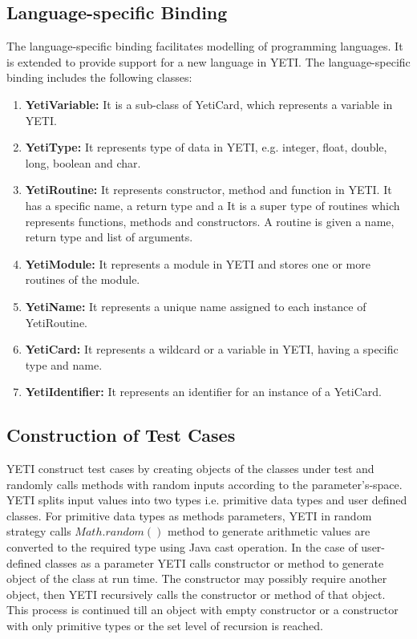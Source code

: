 \subsection{Language-specific Binding}
The language-specific binding facilitates modelling of programming languages. It is extended to provide support for a new language in YETI. The language-specific binding includes the following classes:
\begin{enumerate}
\item {\textbf{YetiVariable:}} It is a sub-class of YetiCard, which represents a variable in YETI.
\item {\textbf{YetiType:}} It represents type of data in YETI, e.g. integer, float, double, long, boolean and char.
\item {\textbf{YetiRoutine:}} It represents constructor, method and function in YETI. It has a specific name, a return type and a   It is a super type of routines which represents functions, methods and constructors. A routine is given a name, return type and list of arguments.
\item {\textbf{YetiModule:}} It represents a module in YETI and stores one or more routines of the module.
\item {\textbf{YetiName:}} It represents a unique name assigned to each instance of YetiRoutine.
\item {\textbf{YetiCard:}} It represents a wildcard or a variable in YETI, having a specific type and name.
\item {\textbf{YetiIdentifier:}} It represents an identifier for an instance of a YetiCard.
\end{enumerate}

\subsection{Construction of Test Cases} \label{sec:constructionOfTestCases}
YETI construct test cases by creating objects of the classes under test and randomly calls methods with random inputs according to the parameter's-space. YETI splits input values into two types i.e. primitive data types and user defined classes. For primitive data types as methods parameters, YETI in random strategy calls $Math.random()$ method to generate arithmetic values are converted to the required type using Java cast operation. In the case of user-defined classes as a parameter YETI calls constructor or method to generate object of the class at run time. The constructor may possibly require another object, then YETI recursively calls the constructor or method of that object. This process is continued till an object with empty constructor or a constructor with only primitive types or the set level of recursion is reached.


